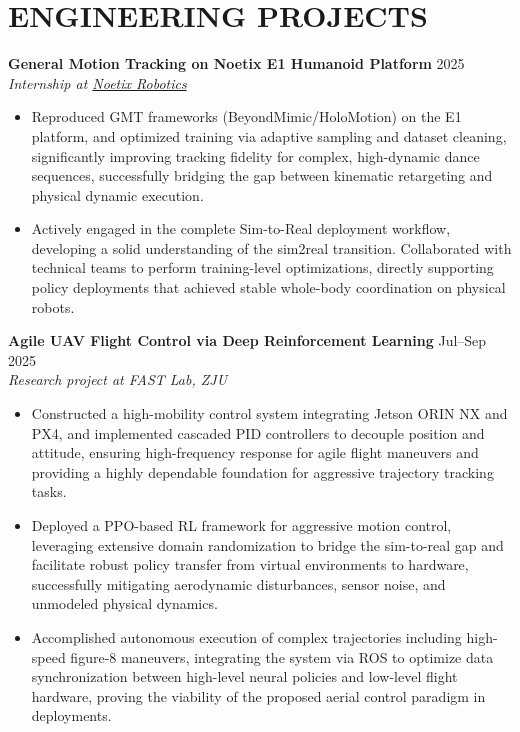 \documentclass[a4paper,11pt]{article}
\begin{document}
\section{ENGINEERING PROJECTS}

\textbf{General Motion Tracking on Noetix E1 Humanoid Platform} \hfill 2025 \\
\textit{Internship at \href{https://noetixrobotics.com/en}{Noetix Robotics}}
\begin{itemize}[nosep,after=\strut, leftmargin=1.5em, itemsep=3pt,label=$\bullet$]
\item Reproduced GMT frameworks (BeyondMimic/HoloMotion) on the E1 platform, and optimized training via adaptive sampling and dataset cleaning, significantly improving tracking fidelity for complex, high-dynamic dance sequences, successfully bridging the gap between kinematic retargeting and physical dynamic execution.
\item Actively engaged in the complete Sim-to-Real deployment workflow, developing a solid understanding of the sim2real transition. Collaborated with technical teams to perform training-level optimizations, directly supporting policy deployments that achieved stable whole-body coordination on physical robots.
\end{itemize}

\vspace{6pt}

\textbf{Agile UAV Flight Control via Deep Reinforcement Learning} \hfill Jul--Sep 2025 \\
\textit{Research project at FAST Lab, ZJU}
\begin{itemize}[nosep,after=\strut, leftmargin=1.5em, itemsep=3pt,label=$\bullet$]
\item Constructed a high-mobility control system integrating Jetson ORIN NX and PX4, and implemented cascaded PID controllers to decouple position and attitude, ensuring high-frequency response for agile flight maneuvers and providing a highly dependable foundation for aggressive trajectory tracking tasks.
\item Deployed a PPO-based RL framework for aggressive motion control, leveraging extensive domain randomization to bridge the sim-to-real gap and facilitate robust policy transfer from virtual environments to hardware, successfully mitigating aerodynamic disturbances, sensor noise, and unmodeled physical dynamics.
\item Accomplished autonomous execution of complex trajectories including high-speed figure-8 maneuvers, integrating the system via ROS to optimize data synchronization between high-level neural policies and low-level flight hardware, proving the viability of the proposed aerial control paradigm in deployments.
\end{itemize}
\end{document}
